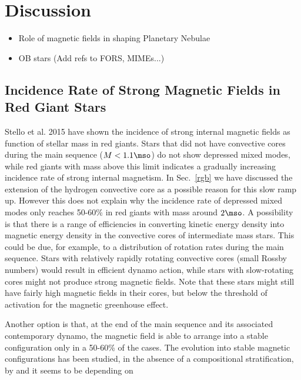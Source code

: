 \section{Discussion}
\begin{itemize}
\item Role of magnetic fields in shaping Planetary Nebulae
\item OB stars (Add refs to FORS, MIMEs...)
\end{itemize}

\subsection{Incidence Rate of Strong Magnetic Fields in Red Giant Stars}
Stello et al. 2015 have shown the incidence of strong internal magnetic fields as function of stellar mass in red giants. Stars that did not have convective cores during the main sequence ($M<1.1\mso$) do not show depressed mixed modes, while red giants with mass above this limit indicates a gradually increasing incidence rate of strong internal magnetism.    In Sec.~\ref{rgb} we have discussed the extension of the hydrogen convective core as a possible reason for this slow ramp up. However this does not explain why the incidence rate of depressed mixed modes only reaches 50-60\% in red giants with mass around $2\mso$.
A possibility is that there is a range of efficiencies in converting kinetic energy density into magnetic energy density in the convective cores of intermediate mass stars. This could be due, for example, to a distribution of rotation rates during the main sequence. Stars with relatively rapidly rotating convective cores (small Rossby numbers) would result in efficient dynamo action, while stars with slow-rotating cores might not produce strong magnetic fields. Note that these stars  might still have fairly high magnetic fields in their cores, but below the threshold of activation for the magnetic greenhouse effect.

Another option is that, at the end of the main sequence and its associated contemporary dynamo, the magnetic field is able to arrange into a stable configuration only in a 50-60\% of the cases. The evolution into stable magnetic configurations has been studied, in the absence of a compositional stratification, by  and it seems to be depending on 
  